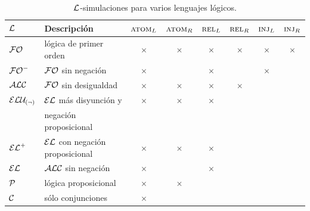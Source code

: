 \begin{table}[t]

\begin{tabular}{|l|l|cccccc|}
\hline
  $\mathcal{L}$ & Descripci\'on &$\textsc{atom}_L$ & $\textsc{atom}_R$ & $\textsc{rel}_L$ & $\textsc{rel}_R$ & $\textsc{inj}_L\space$ & $\textsc{inj}_R\space$ \\
  \hline
  $\mathcal{FO}$ & l\'ogica de primer orden & $\times$ & $\times$ & $\times$ & $\times$ & $\times$ & $\times$ \\ \hline
  ${\mathcal{FO}^-}$ & $\mathcal{FO}$ sin negaci\'on & $\times$ & & $\times$ && $\times$ & \\ \hline 
  $\mathcal{ALC}$   & $\mathcal{FO}$ sin desigualdad & $\times$ & $\times$ & $\times$ & $\times$&& \\ \hline
 
	$\mathcal{ELU_{(\neg)} }$ & $\mathcal{EL}$ m\'as disyunci\'on y  & $\times$ & $\times$ &  $\times$ & & & \\ 
	&negaci\'on proposicional&&&&&&\\ \hline
  ${\mathcal{EL}^+}$ & $\mathcal{EL}$ con negaci\'on proposicional & $\times$ & $\times$ &  $\times$ & & & \\ \hline
	$\mathcal{EL}$   & $\mathcal{ALC}$ sin negaci\'on & $\times$ & &  $\times$ & & & \\ \hline
	$\mathcal{P}$ & l\'ogica proposicional& $\times$ & $\times$ & & & & \\ \hline
	$\mathcal{C}$ & s\'olo conjunciones& $\times$ &  &  & & & \\ 
	
\hline	
\end{tabular}

\caption{$\mathcal{L}$-simulaciones para varios lenguajes l\'ogicos.}\label{tab:simuls}
\end{table}


